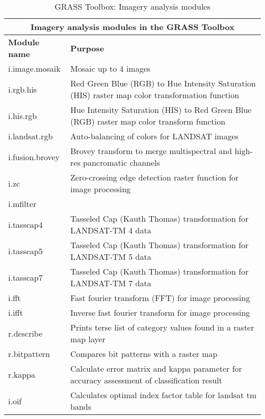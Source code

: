 \begin{table}[ht]
\centering
\caption{GRASS Toolbox: Imagery analysis modules}\medskip
 \begin{tabular}{|p{4cm}|p{12cm}|}
  \hline \multicolumn{2}{|c|}{\textbf{Imagery analysis modules in the GRASS
  Toolbox}} \\
  \hline \textbf{Module name} & \textbf{Purpose} \\
  \hline i.image.mosaik & Mosaic up to 4 images \\
  \hline i.rgb.his & Red Green Blue (RGB) to Hue Intensity Saturation (HIS)
  raster map color transformation function \\
  \hline i.his.rgb & Hue Intensity Saturation (HIS) to Red Green Blue (RGB)
  raster map color transform function \\
  \hline i.landsat.rgb & Auto-balancing of colors for LANDSAT images \\
  \hline i.fusion.brovey & Brovey transform to merge multispectral and
  high-res pancromatic channels \\
  \hline i.zc & Zero-crossing edge detection raster function for image
  processing \\
  \hline i.mfilter &  \\
  \hline i.tasscap4 & Tasseled Cap (Kauth Thomas) transformation for
  LANDSAT-TM 4 data \\
  \hline i.tasscap5 & Tasseled Cap (Kauth Thomas) transformation for
  LANDSAT-TM 5 data \\
  \hline i.tasscap7 & Tasseled Cap (Kauth Thomas) transformation for
  LANDSAT-TM 7 data \\
  \hline i.fft & Fast fourier transform (FFT) for image processing \\
  \hline i.ifft & Inverse fast fourier transform for image processing \\
  \hline r.describe & Prints terse list of category values found in a raster
  map layer \\
  \hline r.bitpattern & Compares bit patterns with a raster map \\
  \hline r.kappa & Calculate error matrix and kappa parameter for accuracy
  assessment of classification result \\
  \hline i.oif & Calculates optimal index factor table for landsat tm bands \\
\hline
\end{tabular}
\end{table}

\clearpage

